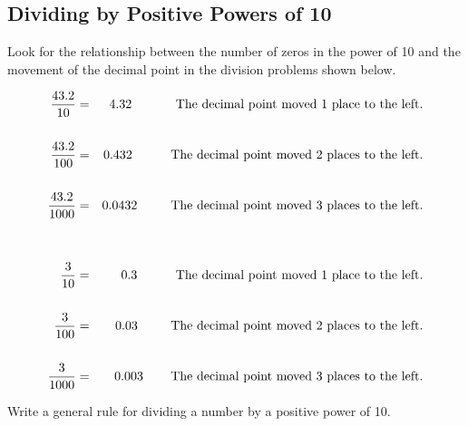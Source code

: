 \documentclass{ximera}
\begin{document}
\subsection*{Dividing by Positive Powers of 10}

Look for the relationship between the number of zeros in the power of 10 and the movement of the decimal point in the division problems shown below.

\begin{eqnarray*}
\frac{43.2}{10} &=&  4.32 \hspace{0.48in} \textrm{The decimal point moved 1 place to the left.} \\
& & \\
\frac{43.2}{100} &=& 0.432 \hspace{0.42in}  \textrm{The decimal point moved 2 places to the left.} \\
& & \\
\frac{43.2}{1000} &=& 0.0432 \hspace{0.365in}  \textrm{The decimal point moved 3 places to the left.} \\
& & \\
& & \\
\frac{3}{10} &=& 0.3 \hspace{0.42in} \textrm{The decimal point moved 1 place to the left.} \\
& & \\
\frac{3}{100} &=& 0.03 \hspace{0.36in} \textrm{The decimal point moved 2 places to the left.} \\
& & \\
\frac{3}{1000} &=& 0.003 \hspace{0.3in} \textrm{The decimal point moved 3 places to the left.} \\
\end{eqnarray*}

\begin{problem} Write a general rule for dividing a number by a positive power of 10.

  ~ \\[3em]  %

\begin{multipleChoice}
  \end{multipleChoice}

\end{problem}
\end{document}
